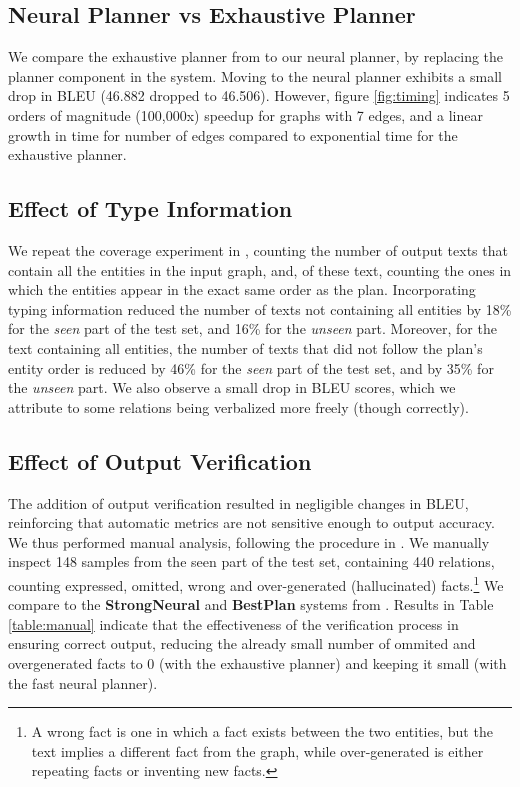 \documentclass[11pt,a4paper,table,xcdraw]{article}
\begin{document}
\subsection{Neural Planner vs Exhaustive Planner}\label{eval:planner}


We compare the exhaustive planner from \citet{step-by-step} to our neural planner, by replacing the planner component in the \citet{step-by-step} system. Moving to the neural planner exhibits a small drop in BLEU (46.882 dropped to 46.506). However, figure \ref{fig:timing} indicates 5 orders of magnitude (100,000x) speedup for graphs with 7 edges, and a linear growth in time for number of edges compared to exponential time for the exhaustive planner.


\subsection{Effect of Type Information}\label{eval:typing}
We repeat the coverage experiment in \cite{step-by-step}, counting the number of output texts that contain all the entities in the input graph, and, of these text, counting the ones in which the entities appear in the exact same order as the plan. 
Incorporating typing information reduced the number of texts not containing all entities by 18\% for the \emph{seen} part of the test set, and 16\% for the \emph{unseen} part. Moreover, for the text containing all entities, the number of texts that did not follow the plan's entity order is reduced by 46\% for the \emph{seen} part of the test set, and by 35\% for the \emph{unseen} part. We also observe a small drop in BLEU scores, which we attribute to some relations being verbalized more freely (though correctly).



\subsection{Effect of Output Verification}\label{eval:verification}
The addition of output verification resulted in negligible changes in BLEU, reinforcing that automatic metrics are not sensitive enough to output accuracy. We thus performed manual analysis, following the procedure in \citet{step-by-step}. We manually inspect 148 samples from the seen part of the test set, containing 440 relations, counting expressed, omitted, wrong and over-generated (hallucinated) facts.\footnote{A wrong fact is one in which a fact exists between the two entities, but the text implies a different fact from the graph, while over-generated is either repeating facts or inventing new facts.} We compare to the \textbf{StrongNeural} and \textbf{BestPlan} systems from \citet{step-by-step}. Results in Table \ref{table:manual} indicate that the effectiveness of the verification process in ensuring correct output, reducing the already small number of ommited and overgenerated facts to 0 (with the exhaustive planner) and keeping it small (with the fast neural planner).
\end{document}
